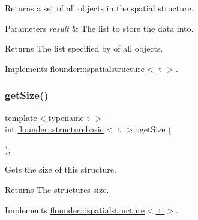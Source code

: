 Returns a set of all objects in the spatial structure. 


\begin{DoxyParams}{Parameters}
{\em result} & The list to store the data into. \\
\hline
\end{DoxyParams}
\begin{DoxyReturn}{Returns}
The list specified by of all objects. 
\end{DoxyReturn}


Implements \hyperlink{classflounder_1_1ispatialstructure_a34a6ce64313ee41c5c188c9359997798}{flounder\+::ispatialstructure$<$ t $>$}.

\mbox{\label{classflounder_1_1structurebasic_aaef414a91ef6bd96982b1f7c10ae31b2}} 
\subsubsection{\texorpdfstring{get\+Size()}{getSize()}}
{\footnotesize\ttfamily template$<$typename t $>$ \\
int \hyperlink{classflounder_1_1structurebasic}{flounder\+::structurebasic}$<$ t $>$\+::get\+Size (\begin{DoxyParamCaption}{ }\end{DoxyParamCaption})\hspace{0.3cm}{\ttfamily [override]}, {\ttfamily [virtual]}}



Gets the size of this structure. 

\begin{DoxyReturn}{Returns}
The structures size. 
\end{DoxyReturn}


Implements \hyperlink{classflounder_1_1ispatialstructure_a9daf7778a9bde304e08070eaeffb8fbd}{flounder\+::ispatialstructure$<$ t $>$}.

\mbox{\label{classflounder_1_1structurebasic_a8b185614cd8ee80a3ca14cc4f368e055}} 
